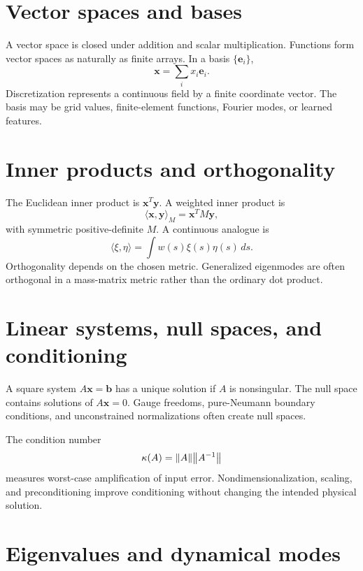 \documentclass[11pt]{article}
\begin{document}
\section{Vector spaces and bases}

A vector space is closed under addition and scalar multiplication. Functions form vector spaces as naturally as finite arrays. In a basis $\{\mathbf e_i\}$,
\begin{equation}
\mathbf x=\sum_i x_i\mathbf e_i.
\end{equation}
Discretization represents a continuous field by a finite coordinate vector. The basis may be grid values, finite-element functions, Fourier modes, or learned features.


\section{Inner products and orthogonality}

The Euclidean inner product is $\mathbf x^T\mathbf y$. A weighted inner product is
\begin{equation}
\langle\mathbf x,\mathbf y\rangle_M=\mathbf x^TM\mathbf y,
\end{equation}
with symmetric positive-definite $M$. A continuous analogue is
\begin{equation}
\langle\xi,\eta\rangle=\int w(s)\xi(s)\eta(s)\,ds.
\end{equation}
Orthogonality depends on the chosen metric. Generalized eigenmodes are often orthogonal in a mass-matrix metric rather than the ordinary dot product.


\section{Linear systems, null spaces, and conditioning}

A square system $A\mathbf x=\mathbf b$ has a unique solution if $A$ is nonsingular. The null space contains solutions of $A\mathbf x=0$. Gauge freedoms, pure-Neumann boundary conditions, and unconstrained normalizations often create null spaces.

The condition number
\begin{equation}
\kappa(A)=\norm{A}\norm{A^{-1}}
\end{equation}
measures worst-case amplification of input error. Nondimensionalization, scaling, and preconditioning improve conditioning without changing the intended physical solution.


\section{Eigenvalues and dynamical modes}
\end{document}
